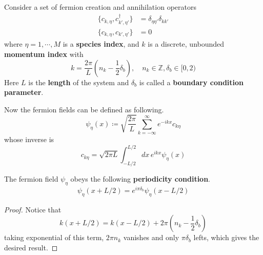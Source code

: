 \begin{defn}
Consider a set of fermion creation and annihilation operators
\begin{align}
\{c_{k,\eta},c_{k',\eta'}^\dagger \}&=\delta_{\eta\eta'}\delta_{kk'}\\
\{c_{k,\eta},c_{k',\eta'} \}&=0
\end{align}
where $\eta=1,\cdots,M$ is a \textbf{species index}, and $k$ is a discrete, unbounded \textbf{momentum index} with
\begin{equation}
k=\frac{2\pi}{L}\left(n_k-\frac{1}{2}\delta_b\right),\quad n_k\in \mathbb{Z}, \delta_b\in [0,2)
\end{equation}
Here $L$ is the \textbf{length} of the system and $\delta_b$ is called a \textbf{boundary condition parameter}.

Now the fermion fields can be defined as following.
\begin{equation}
\psi_\eta(x)\coloneqq \sqrt{\frac{2\pi}{L}}\sum_{k=-\infty}^\infty e^{-ikx}c_{k\eta}
\end{equation}
whose inverse is
\begin{equation}
c_{k\eta}=\sqrt{2\pi L}\int_{-L/2}^{L/2} dx\, e^{ikx}\psi_{\eta}(x)
\end{equation}
\end{defn}

\begin{prop}
The fermion field $\psi_\eta$ obeys the following \textbf{periodicity condition}.
\begin{equation}
\psi_\eta(x+L/2)=e^{i\pi \delta_b}\psi_\eta (x-L/2)
\end{equation}
\end{prop}
\begin{proof}
Notice that
\begin{equation}
k(x+L/2)=k(x-L/2)+2\pi\left(n_k-\frac{1}{2}\delta_b\right)
\end{equation}
taking exponential of this term, $2\pi n_k$ vanishes and only $\pi\delta_b$ lefts, which gives the desired result.
\end{proof}

